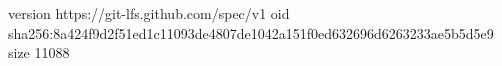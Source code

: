 version https://git-lfs.github.com/spec/v1
oid sha256:8a424f9d2f51ed1c11093de4807de1042a151f0ed632696d6263233ae5b5d5e9
size 11088
